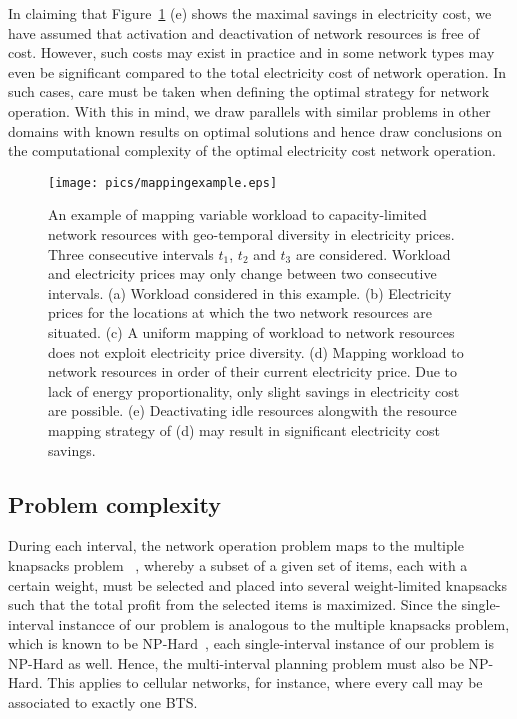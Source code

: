 In claiming that Figure~\ref{fig:mappingexample} (e) shows the maximal savings in electricity cost, we have assumed that activation and deactivation of network resources is free of cost. However, such costs may exist in practice and in some network types may even be significant compared to the total electricity cost of network operation. In such cases, care must be taken when defining the optimal strategy for network operation. With this in mind, we draw parallels with similar problems in other domains with known results on optimal solutions and hence draw conclusions on the computational complexity of the optimal electricity cost network operation.

\begin{figure}
\centering
\texttt{[image: pics/mappingexample.eps]}
\caption{An example of mapping variable workload to capacity-limited network resources with geo-temporal diversity in electricity prices. Three consecutive intervals $t_1$, $t_2$ and $t_3$ are considered. Workload and electricity prices may only change between two consecutive intervals. (a) Workload considered in this example. (b) Electricity prices for the locations at which the two network resources are situated. (c) A uniform mapping of workload to network resources does not exploit electricity price diversity. (d) Mapping workload to network resources in order of their current electricity price. Due to lack of energy proportionality, only slight savings in electricity cost are possible. (e) Deactivating idle resources alongwith the resource mapping strategy of (d) may result in significant electricity cost savings.}
\label{fig:mappingexample}
\end{figure}



\subsection{Problem complexity}
\label{subsec:framework:complexity}
During each interval, the network operation problem maps to the multiple knapsacks problem ~\cite{kellerer:knapsackproblems:2005,Chekuri99aptas}, whereby a subset of a given set of items, each with a certain weight, must be selected and placed into several weight-limited knapsacks such that the total profit from the selected items is maximized. Since the single-interval instancce of our problem is analogous to the multiple knapsacks problem, which is known to be NP-Hard~\cite{kellerer:knapsackproblems:2005,Chekuri99aptas}, each single-interval instance of our problem is NP-Hard as well. Hence, the multi-interval planning problem must also be NP-Hard. This applies to cellular networks, for instance, where every call may be associated to exactly one BTS. 

